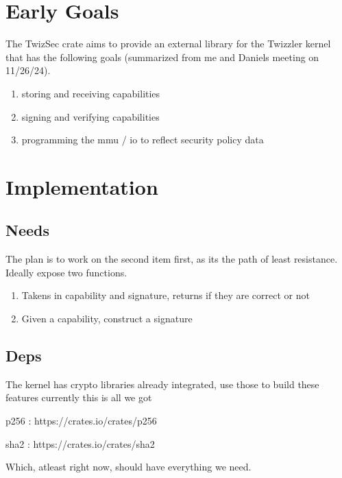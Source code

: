 \documentclass{article}
\title{\ASSIGNMENT}
\author{\NAME}
\date{\CLASS}
\begin{document}
\pagestyle{fancy}
\fancyfoot{}
\fancyhead{}
\fancyfoot[L]{\ASSIGNMENT\ -- \CLASS\ -- \NAME}
\fancyfoot[R]{\thepage}

\maketitle


\section{Early Goals}

The TwizSec crate aims to provide an external library for the Twizzler kernel that has
the following goals (summarized from me and Daniels meeting on 11/26/24).
\begin{enumerate}
    \item storing and receiving capabilities
    \item signing and verifying capabilities
    \item programming the mmu / io to reflect security policy data
\end{enumerate}

\section{Implementation}


\subsection{Needs}
The plan is to work on the second item first, as its the path of least resistance.
Ideally expose two functions.
\begin{enumerate}
    \item Takens in capability and signature, returns if they are correct or not
    \item Given a capability, construct a signature
\end{enumerate}

\subsection{Deps}
The kernel has crypto libraries already integrated, use those to build these features
currently this is all we got

p256 : https://crates.io/crates/p256

sha2 : https://crates.io/crates/sha2

Which, atleast right now, should have everything we need.
\end{document}
